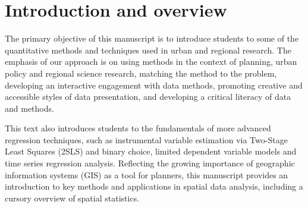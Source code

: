 \chapter{Introduction and overview}\label{chap_Intro}
The primary objective of this manuscript is to introduce students to some of the quantitative methods and techniques used in urban and regional research. The emphasis of our approach is on using methods in the context of planning, urban policy and regional science research, matching the method to the problem, developing an interactive engagement with data methods, promoting creative and accessible styles of data presentation, and developing a critical literacy of data and methods.

This text also introduces students to the fundamentals of more advanced regression techniques, such as instrumental variable estimation via Two-Stage Least Squares (2SLS) and binary choice, limited dependent variable models and time series regression analysis. Reflecting the growing importance of geographic information systems (GIS) as a tool for planners, this manuscript provides an introduction to key methods and applications in spatial data analysis, including a cursory overview of spatial statistics.

